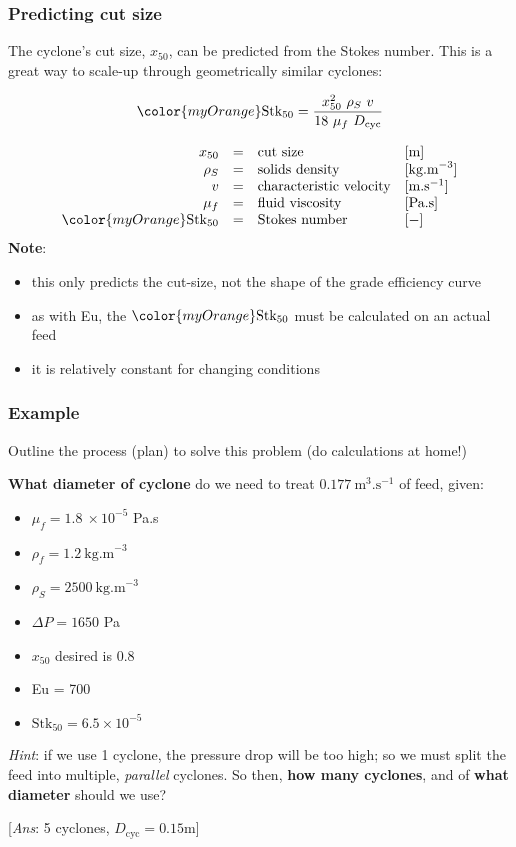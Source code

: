 \begin{frame}\frametitle{Predicting cut size}
	The cyclone's cut size, $x_{50}$, can be predicted from the Stokes number. This is a great way to scale-up through geometrically similar cyclones:
	\begin{exampleblock}{}
		\[{\color{myOrange}\text{Stk}_{50}} = \dfrac{x_{50}^2 \,\,\rho_S \,\,v}{18\,\, \mu_f \,\,D_\text{cyc}}\]
	\end{exampleblock}
	\[
		\begin{array}{rcll}
			x_{50}		&=& \text{cut size} 				&[\text{m}]\\
			\rho_S		&=& \text{solids density} 			&[\text{kg.m}^{-3}]\\
			v 			&=& \text{characteristic velocity} 	&[\text{m.s}^{-1}]\\
			\mu_f	    &=& \text{fluid viscosity}        	&[\text{Pa.s}]\\
			{\color{myOrange}\text{Stk}_{50}} &=& \text{Stokes number}  & [-]
		\end{array}
	\]
	\textbf{Note}: 
	\begin{itemize}
		\item	this only predicts the cut-size, not the shape of the grade efficiency curve
		\item	as with Eu, the ${\color{myOrange}\text{Stk}_{50}}$ must be calculated on an actual feed
		\item	it is relatively constant for changing conditions
	\end{itemize}
\end{frame}

\begin{frame}\frametitle{Example}
	
	Outline the process (plan) to solve this problem (do calculations at home!)
	
	\vspace{12pt}
	\textbf{What diameter of cyclone} do we need to treat $0.177~\text{m}^3\text{.s}^{-1}$ of feed, given:
	\begin{itemize}
		\item	$\mu_f = 1.8~\times 10^{-5}$ Pa.s
		\item	$\rho_f = 1.2~\text{kg.m}^{-3}$
		\item	$\rho_S	= 2500~\text{kg.m}^{-3}$
		\item	$\Delta P = 1650$ Pa
		\item	$x_{50}$ desired is 0.8 \micron
		\item	Eu = 700
		\item	$\text{Stk}_{50} = 6.5 \times 10^{-5}$
	\end{itemize}
	\emph{Hint}: if we use 1 cyclone, the pressure drop will be too high; so we must split the feed into multiple, \emph{parallel} cyclones. So then,
	\textbf{how many cyclones}, and of \textbf{what diameter} should we use?
	
	\vspace{8pt}
	{\scriptsize {\color{myOrange}[\emph{Ans}: 5 cyclones, $D_\text{cyc}=0.15$m]}}
\end{frame}


